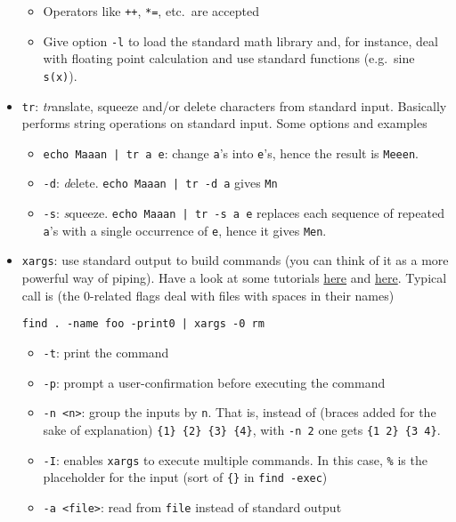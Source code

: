 \documentclass[a4paper,12pt,%
              final%
              ]{article}
\begin{document}
\begin{itemize}
\begin{itemize}
\begin{itemize}
        \end{itemize}
      \item Operators like \verb|++|, \verb|*=|, etc.~are accepted
      \item Give option \verb|-l| to load the standard math library and, for instance, deal with floating point calculation and use standard functions (e.g.~sine \verb|s(x)|).
    \end{itemize}
  \item \texttt{tr}: \emph{tr}anslate, squeeze and/or delete characters from standard input. Basically performs string operations on standard input. Some options and examples
    \begin{itemize}
      \item \verb!echo Maaan | tr a e!: change \texttt{a}'s into \texttt{e}'s, hence the result is \texttt{Meeen}.
      \item \verb|-d|: \emph{d}elete. \verb!echo Maaan | tr -d a! gives \texttt{Mn}
      \item \verb|-s|: \emph{s}queeze. \verb!echo Maaan | tr -s a e! replaces each sequence of repeated \texttt{a}'s with a single occurrence of \texttt{e}, hence it gives \texttt{Men}.
    \end{itemize}
  \item \texttt{xargs}: use standard output to build commands (you can think of it as a more powerful way of piping). Have a look at some tutorials \href{https://shapeshed.com/unix-xargs/}{here} and \href{https://www.thegeekstuff.com/2013/12/xargs-examples/}{here}. Typical call is (the 0-related flags deal with files with spaces in their names)
\begin{verbatim}
find . -name foo -print0 | xargs -0 rm
\end{verbatim}
    \begin{itemize}
      \item \texttt{-t}: print the command
      \item \texttt{-p}: prompt a user-confirmation before executing the command
      \item \texttt{-n <n>}: group the inputs by \texttt{n}. That is, instead of (braces added for the sake of explanation) \verb|{1} {2} {3} {4}|, with \texttt{-n 2} one gets \verb|{1 2} {3 4}|.
      \item \texttt{-I}: enables \texttt{xargs} to execute multiple commands. In this case, \verb|%| is the placeholder for the input (sort of \verb|{}| in \verb|find -exec|)
      \item \texttt{-a <file>}: read from \texttt{file} instead of standard output

\end{itemize}
\end{itemize}
\end{document}
